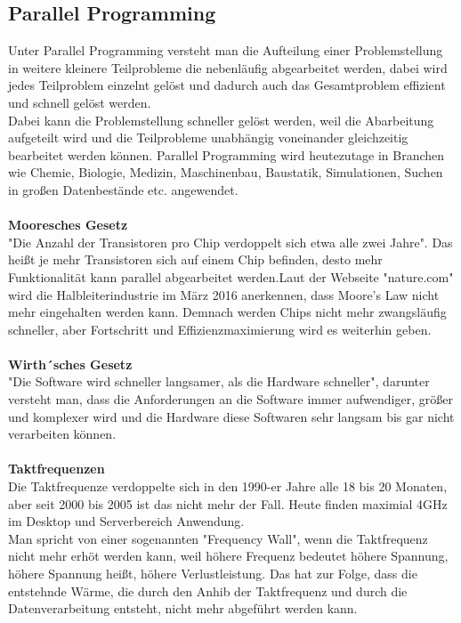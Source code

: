 \documentclass[a4paper,12pt]{article}
\begin{document}
\subsection{Parallel Programming}
Unter Parallel Programming versteht man die Aufteilung einer Problemstellung in weitere kleinere Teilprobleme die nebenläufig abgearbeitet werden, dabei wird jedes Teilproblem einzelnt gelöst und dadurch auch das Gesamtproblem effizient und schnell gelöst werden. 
\\Dabei kann die Problemstellung schneller gelöst werden, weil die Abarbeitung aufgeteilt wird und die Teilprobleme unabhängig voneinander gleichzeitig bearbeitet werden können. Parallel Programming wird heutezutage in Branchen wie Chemie, Biologie, Medizin, Maschinenbau, Baustatik, Simulationen, Suchen in großen Datenbestände etc. angewendet.\\\\
\textbf{Mooresches Gesetz\\}
"Die Anzahl der Transistoren pro Chip verdoppelt sich etwa alle zwei Jahre". Das heißt je mehr Transistoren sich auf einem Chip befinden, desto mehr Funktionalität kann parallel abgearbeitet werden.Laut der Webseite "nature.com" wird die Halbleiterindustrie im März 2016 anerkennen, dass Moore's Law nicht mehr eingehalten werden kann. Demnach werden Chips nicht mehr zwangsläufig schneller, aber Fortschritt und Effizienzmaximierung wird es weiterhin geben.\\\\
\textbf{Wirth´sches Gesetz\\}
"Die Software wird schneller langsamer, als die Hardware schneller", darunter versteht man, dass die Anforderungen an die Software immer aufwendiger, größer und komplexer wird und die Hardware diese Softwaren sehr langsam bis gar nicht verarbeiten können.\\\\
\textbf{Taktfrequenzen\\}
Die Taktfrequenze verdoppelte sich in den 1990-er Jahre alle 18 bis 20 Monaten, aber seit 2000 bis 2005 ist das nicht mehr der Fall. Heute finden maximial 4GHz im Desktop und Serverbereich Anwendung.\\Man spricht von einer sogenannten "Frequency Wall", wenn die Taktfrequenz nicht mehr erhöt werden kann, weil höhere Frequenz bedeutet höhere Spannung, höhere Spannung heißt, höhere Verlustleistung. Das hat zur Folge, dass die entstehnde Wärme, die durch den Anhib der Taktfrequenz und durch die Datenverarbeitung entsteht, nicht mehr abgeführt werden kann.
\end{document}
